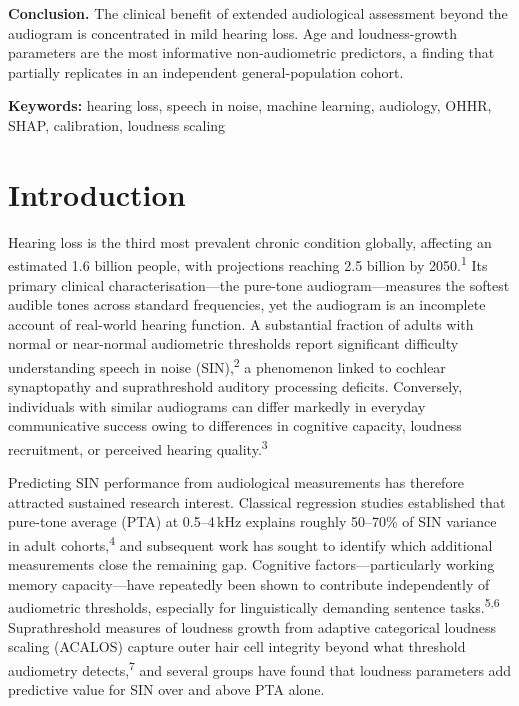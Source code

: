 \documentclass[12pt,a4paper]{article}
\begin{document}
\noindent\textbf{Conclusion.} The clinical benefit of extended audiological
assessment beyond the audiogram is concentrated in mild hearing loss. Age and
loudness-growth parameters are the most informative non-audiometric predictors,
a finding that partially replicates in an independent general-population cohort.

\medskip
\noindent\textbf{Keywords:} hearing loss, speech in noise, machine learning,
audiology, OHHR, SHAP, calibration, loudness scaling

\section{Introduction}

Hearing loss is the third most prevalent chronic condition globally, affecting
an estimated 1.6 billion people, with projections reaching 2.5 billion by
2050.\textsuperscript{1}  Its primary clinical characterisation---the pure-tone
audiogram---measures the softest audible tones across standard frequencies,
yet the audiogram is an incomplete account of real-world hearing function.
A substantial fraction of adults with normal or near-normal audiometric
thresholds report significant difficulty understanding speech in noise
(SIN),\textsuperscript{2} a phenomenon linked to cochlear synaptopathy and
suprathreshold auditory processing deficits.  Conversely, individuals with
similar audiograms can differ markedly in everyday communicative success
owing to differences in cognitive capacity, loudness recruitment, or perceived
hearing quality.\textsuperscript{3}

Predicting SIN performance from audiological measurements has therefore
attracted sustained research interest.  Classical regression studies
established that pure-tone average (PTA) at 0.5--4\,kHz explains roughly
50--70\% of SIN variance in adult cohorts,\textsuperscript{4} and
subsequent work has sought to identify which additional measurements close
the remaining gap.  Cognitive factors---particularly working memory
capacity---have repeatedly been shown to contribute independently of
audiometric thresholds, especially for linguistically demanding sentence
tasks.\textsuperscript{5,6}  Suprathreshold measures of loudness growth from
adaptive categorical loudness scaling (ACALOS) capture outer hair cell
integrity beyond what threshold audiometry detects,\textsuperscript{7} and
several groups have found that loudness parameters add predictive value for
SIN over and above PTA alone.
\end{document}
